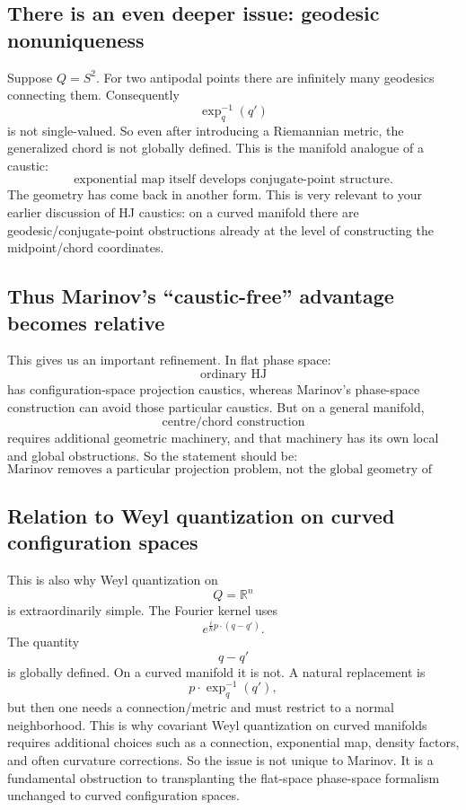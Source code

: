 \subsection{There is an even deeper issue: geodesic nonuniqueness}
Suppose \(Q=S^2\).
For two antipodal points there are infinitely many geodesics connecting them.
Consequently
$$ \exp_q^{-1}(q') $$
is not single-valued.
So even after introducing a Riemannian metric, the generalized chord is not
globally defined.
This is the manifold analogue of a caustic:
$$ \boxed{ \text{exponential map itself develops conjugate-point structure}. } $$
The geometry has come back in another form.
This is very relevant to your earlier discussion of HJ caustics: on a curved
manifold there are geodesic/conjugate-point obstructions already at the level
of constructing the midpoint/chord coordinates.

\subsection{Thus Marinov's “caustic-free” advantage becomes relative}
This gives us an important refinement.
In flat phase space:
$$ \text{ordinary HJ} $$
has configuration-space projection caustics, whereas Marinov's phase-space
construction can avoid those particular caustics.
But on a general manifold,
$$ \text{centre/chord construction} $$
requires additional geometric machinery, and that machinery has its own local
and global obstructions.
So the statement should be:
$$ \boxed{ \text{Marinov removes a particular projection problem, not the
global geometry of generating functions.} } $$

\subsection{Relation to Weyl quantization on curved configuration spaces}
This is also why Weyl quantization on
$$ Q=\mathbb R^n $$
is extraordinarily simple.
The Fourier kernel uses
$$ e^{\frac{i}{\hbar}p\cdot(q-q')}. $$
The quantity
$$ q-q' $$
is globally defined.
On a curved manifold it is not.
A natural replacement is
$$ p\cdot \exp_q^{-1}(q'), $$
but then one needs a connection/metric and must restrict to a normal neighborhood.
This is why covariant Weyl quantization on curved manifolds requires additional
choices such as a connection, exponential map, density factors, and often
curvature corrections.
So the issue is not unique to Marinov. It is a fundamental obstruction to
transplanting the flat-space phase-space formalism unchanged to curved
configuration spaces.

